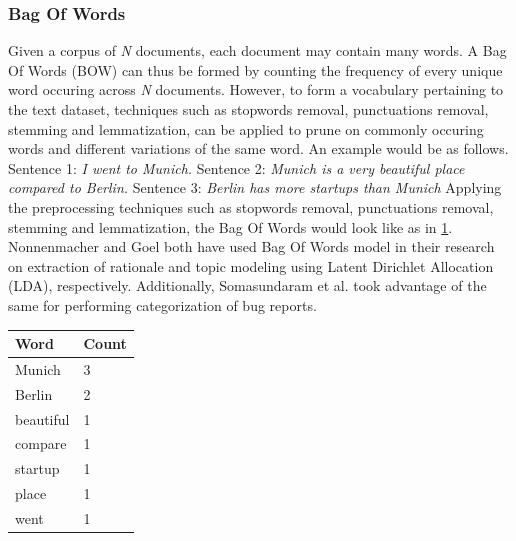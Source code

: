 \documentclass[a4paper,12pt,twoside]{report}
\begin{document}
\subsubsection{Bag Of Words}
Given a corpus of \textit{N} documents, each document may contain many words. A Bag Of Words (\acs{BOW}) can thus be formed by counting the frequency of every unique word occuring across \textit{N} documents. However, to form a vocabulary pertaining to the text dataset, techniques such as stopwords removal, punctuations removal, stemming and lemmatization, can be applied to prune on commonly occuring words and different variations of the same word. An example would be as follows.
\newline \newline
Sentence 1: \textit{I went to Munich.}
\newline \newline
Sentence 2: \textit{Munich is a very beautiful place compared to Berlin.}
\newline \newline
Sentence 3: \textit{Berlin has more startups than Munich}
\newline \newline
Applying the preprocessing techniques such as stopwords removal, punctuations removal, stemming and lemmatization, the Bag Of Words would look like as in \ref{tab:bowExample}. Nonnenmacher\cite{Nonnenmacher2017} and Goel \cite{Goel2017} both have used Bag Of Words model in their research on extraction of rationale and topic modeling using Latent Dirichlet Allocation (\acs{LDA}), respectively. Additionally, Somasundaram et al. \cite{Somasundaram2012} took advantage of the same for performing categorization of bug reports.
\begin{table} %
    \centering
    \begin{adjustbox}{max width=\columnwidth}
    \def\arraystretch{1} %
    \begin{tabular}{p{2cm} p{2cm}}
        \toprule
        \textbf{Word} & \textbf{Count}\\
        \midrule
			Munich & 3 \\
			Berlin & 2 \\ 
			beautiful & 1 \\ 
			compare & 1 \\ 
			startup & 1 \\
			place & 1 \\ 
			went & 1 \\
        \midrule
    \end{tabular}
    \end{adjustbox}
    \label{tab:bowExample}
\end{table}
\end{document}
